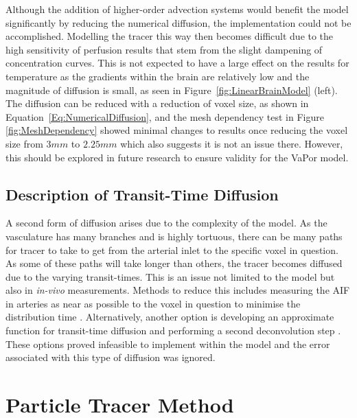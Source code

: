 \documentclass[11pt,english,a4paper,twoside,openright]{report}
\begin{document}
{{{{{{{Although the addition of higher-order advection systems would benefit the model significantly by reducing the numerical diffusion, the implementation could not be accomplished. Modelling the tracer this way then becomes difficult due to the high sensitivity of perfusion results that stem from the slight dampening of concentration curves. This is not expected to have a large effect on the results for temperature as the gradients within the brain are relatively low and the magnitude of diffusion is small, as seen in Figure~\ref{fig:LinearBrainModel} (left). The diffusion can be reduced with a reduction of voxel size, as shown in Equation~\ref{Eq:NumericalDiffusion}, and the mesh dependency test in Figure \ref{fig:MeshDependency} showed minimal changes to results once reducing the voxel size from $3mm$ to $2.25mm$ which also suggests it is not an issue there. However, this should be explored in future research to ensure validity for the VaPor model.

\subsection{Description of Transit-Time Diffusion}

A second form of diffusion arises due to the complexity of the model. As the vasculature has many branches and is highly tortuous, there can be many paths for tracer to take to get from the arterial inlet to the specific voxel in question. As some of these paths will take longer than others, the tracer becomes diffused due to the varying transit-times. This is an issue not limited to the model but also in \textit{in-vivo} measurements. Methods to reduce this includes measuring the AIF in arteries as near as possible to the voxel in question to minimise the distribution time \cite{lia2000quantification}. Alternatively, another option is developing an approximate function for transit-time diffusion and performing a second deconvolution step \cite{sourbron2013classic}. These options proved infeasible to implement within the model and the error associated with this type of diffusion was ignored.

\section[Particle Tracer Method]{{\Large P}article {\Large T}racer {\Large M}ethod}
\label{Sec:4ParticleTracerMethod}

}}}}}}}
\end{document}
